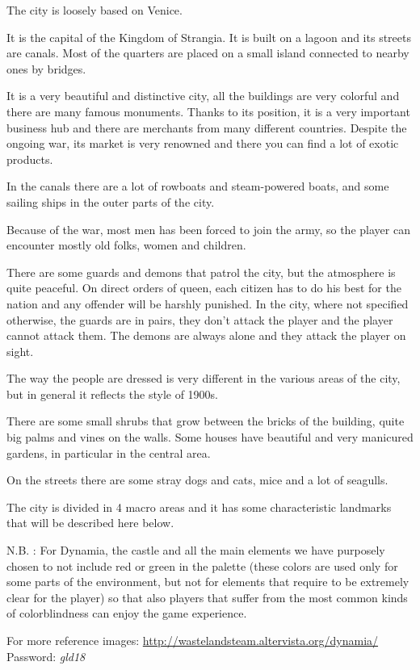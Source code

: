 The city is loosely based on Venice.

It is the capital of the Kingdom of Strangia. It is built on a lagoon and its streets are canals. Most of the quarters are placed on a small island connected to nearby ones by bridges.

It is a very beautiful and distinctive city, all the buildings are very colorful and there are many famous monuments. Thanks to its position, it is a very important business hub and there are merchants from many different countries. Despite the ongoing war, its market is very renowned and there you can find a lot of exotic products.

In the canals there are a lot of rowboats and steam-powered boats, and some sailing ships in the outer parts of the city.

Because of the war, most men has been forced to join the army, so the player can encounter mostly old folks, women and children.

There are some guards and demons that patrol the city, but the atmosphere is quite peaceful. On direct orders of queen, each citizen has to do his best for the nation and any offender will be harshly punished. In the city, where not specified otherwise, the guards are in pairs, they don't attack the player and the player cannot attack them. The demons are always alone and they attack the player on sight.

The way the people are dressed is very different in the various areas of the city, but in general it reflects the style of 1900s.

There are some small shrubs that grow between the bricks of the building, quite big palms and vines on the walls. Some houses have beautiful and very manicured gardens, in particular in the central area.

On the streets there are some stray dogs and cats, mice and a lot of seagulls.

The city is divided in 4 macro areas and it has some characteristic landmarks that will be described here below.

N.B. : For Dynamia, the castle and all the main elements we have purposely chosen to not include red or green in the palette (these colors are used only for some parts of the environment, but not for elements that require to be extremely clear for the player) so that also players that suffer from the most common kinds of colorblindness can enjoy the game experience.

For more reference images: \url{http://wastelandsteam.altervista.org/dynamia/}\\
Password: \textit{gld18}
